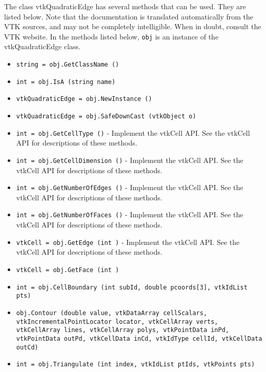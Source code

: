 The class vtkQuadraticEdge has several methods that can be used.
  They are listed below.
Note that the documentation is translated automatically from the VTK sources,
and may not be completely intelligible.  When in doubt, consult the VTK website.
In the methods listed below, \verb|obj| is an instance of the vtkQuadraticEdge class.
\begin{itemize}
\item  \verb|string = obj.GetClassName ()|

\item  \verb|int = obj.IsA (string name)|

\item  \verb|vtkQuadraticEdge = obj.NewInstance ()|

\item  \verb|vtkQuadraticEdge = obj.SafeDownCast (vtkObject o)|

\item  \verb|int = obj.GetCellType ()| -  Implement the vtkCell API. See the vtkCell API for descriptions
 of these methods.

\item  \verb|int = obj.GetCellDimension ()| -  Implement the vtkCell API. See the vtkCell API for descriptions
 of these methods.

\item  \verb|int = obj.GetNumberOfEdges ()| -  Implement the vtkCell API. See the vtkCell API for descriptions
 of these methods.

\item  \verb|int = obj.GetNumberOfFaces ()| -  Implement the vtkCell API. See the vtkCell API for descriptions
 of these methods.

\item  \verb|vtkCell = obj.GetEdge (int )| -  Implement the vtkCell API. See the vtkCell API for descriptions
 of these methods.

\item  \verb|vtkCell = obj.GetFace (int )|

\item  \verb|int = obj.CellBoundary (int subId, double pcoords[3], vtkIdList pts)|

\item  \verb|obj.Contour (double value, vtkDataArray cellScalars, vtkIncrementalPointLocator locator, vtkCellArray verts, vtkCellArray lines, vtkCellArray polys, vtkPointData inPd, vtkPointData outPd, vtkCellData inCd, vtkIdType cellId, vtkCellData outCd)|

\item  \verb|int = obj.Triangulate (int index, vtkIdList ptIds, vtkPoints pts)|


\end{itemize}
